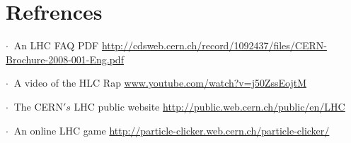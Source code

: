 \;
\;

\section{Refrences}

\;

          $ \cdot \:$ An LHC FAQ PDF \url{http://cdsweb.cern.ch/record/1092437/files/CERN-Brochure-2008-001-Eng.pdf}

\;
\noindent
          $ \cdot \:$  A video of the HLC Rap \url{www.youtube.com/watch?v=j50ZssEojtM}

\;
\noindent
          $ \cdot \:$ The CERN$'s$ LHC public website \url{http://public.web.cern.ch/public/en/LHC}

\;
\noindent
          $ \cdot \:$ An online LHC game \url{http://particle-clicker.web.cern.ch/particle-clicker/}

\;
